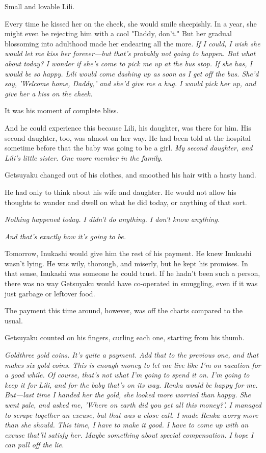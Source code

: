 Small and lovable Lili.

Every time he kissed her on the cheek, she would smile sheepishly. In a
year, she might even be rejecting him with a cool "Daddy, don't." But
her gradual blossoming into adulthood made her endearing all the more.
\emph{If I could, I wish she would let me kiss her forever---but that's probably
not going to happen. But what about today? I wonder if she's come to
pick me up at the bus stop. If she has, I would be so happy. Lili would
come dashing up as soon as I get off the bus. She'd say, 'Welcome home,
Daddy,' and she'd give me a hug. I would pick her up, and give her a
kiss on the cheek.}

It was his moment of complete bliss.

And he could experience this because Lili, his daughter, was there for
him. His second daughter, too, was almost on her way. He had been told
at the hospital sometime before that the baby was going to be a girl. \emph{My
second daughter, and Lili's little sister. One more member in the
family.}

Getsuyaku changed out of his clothes, and smoothed his hair with a hasty
hand.

He had only to think about his wife and daughter. He would not allow his
thoughts to wander and dwell on what he did today, or anything of that
sort.

\emph{Nothing happened today. I didn't do anything. I don't know anything.}

\emph{And that's exactly how it's going to be.}

Tomorrow, Inukashi would give him the rest of his payment. He knew
Inukashi wasn't lying. He was wily, thorough, and miserly, but he kept
his promises. In that sense, Inukashi was someone he could trust. If he
hadn't been such a person, there was no way Getsuyaku would have
co-operated in smuggling, even if it was just garbage or leftover food.

The payment this time around, however, was off the charts compared to
the usual.

Getsuyaku counted on his fingers, curling each one, starting from his
thumb.

\emph{Gold\el three gold coins. It's quite a payment. Add that to the previous
one, and that makes six gold coins. This is enough money to let me live
like I'm on vacation for a good while. Of course, that's not what I'm
going to spend it on. I'm going to keep it for Lili, and for the baby
that's on its way. Renka would be happy for me. But---last time I handed
her the gold, she looked more worried than happy. She went pale, and
asked me, 'Where on earth did you get all this money?'. I managed to
scrape together an excuse, but that was a close call. I made Renka worry
more than she should. This time, I have to make it good. I have to come
up with an excuse that'll satisfy her. Maybe something about special
compensation. I hope I can pull off the lie.}

